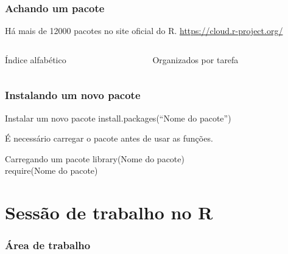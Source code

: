 \documentclass[handout]{beamer}
\begin{document}
  \begin{frame}
    \frametitle{Achando um pacote}
    \begin{center}
      Há mais de 12000 pacotes no site oficial do R.
\vspace{10pt}
\url{https://cloud.r-project.org/}  
    
      \begin{columns}
        \begin{column}{6cm}
          \begin{center}
           Índice alfabético

          \end{center}

        \end{column}
        \begin{column}{6cm}
          \begin{center}
           Organizados por tarefa

          
          \end{center}
        \end{column}
      \end{columns}

\end{center} 
  \end{frame}
  \begin{frame}
    \frametitle{Instalando um novo pacote}
    \begin{block}{Instalar um novo pacote}
       install.packages(``Nome do pacote'')
    \end{block}
   É necessário carregar o pacote antes de usar as funções.
   \begin{block}{Carregando um pacote}
     library(Nome do pacote)\\
     require(Nome do pacote)

   \end{block}
  \end{frame}
\section{Sessão de trabalho no R}
\begin{frame}
  \frametitle{Área de trabalho}
  \begin{center}
  \end{center}
\end{frame}
\end{document}
